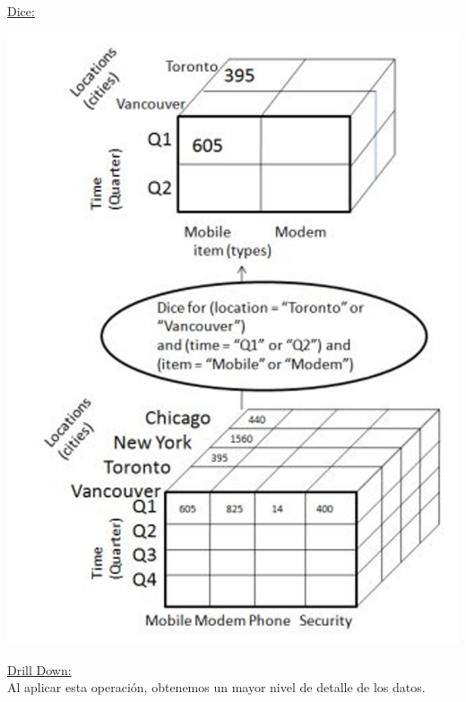 \documentclass{fancyslides}
\begin{document}
\begin{frame}
\misc
{
  \underline{Dice:}
  \begin{center}
  \includegraphics[scale=0.15]{dice}
  \end{center}
}
\end{frame}


\begin{frame}
\misc
{
  \underline{Drill Down:}\\
  Al aplicar esta operación, obtenemos un mayor nivel de detalle de los datos.
}
\end{frame}
\end{document}
